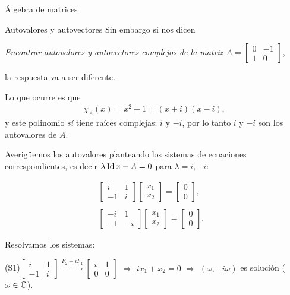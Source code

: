 \begin{chapter}{\'Algebra de matrices}
\begin{section}{Autovalores y autovectores}
        Sin embargo si nos dicen 
        \begin{center}
            \textit{Encontrar autovalores y autovectores complejos de la matriz  $A= \begin{bmatrix}0&-1\\1&0\end{bmatrix}$}, 
        \end{center}
        la respuesta va a ser diferente. 

        Lo  que ocurre es que 
        \begin{align*}
        \chi_A(x)=x^2+1=(x+i)(x-i),
        \end{align*}
        y este polinomio \textit{sí} tiene raíces complejas: $i$ y $-i$, por lo tanto  $i$ y $-i$ son los autovalores de $A$.

        Averigüemos los autovalores planteando los sistemas de ecuaciones correspondientes,  es decir $\lambda \operatorname{Id} x-A =0$ para $\lambda=i, -i$:

        \begin{align*}
            \begin{bmatrix}   i& 1\\ -1&i\end{bmatrix}
            \begin{bmatrix}    x_1\\x_2\end{bmatrix}
            =
            \begin{bmatrix}    0\\0\end{bmatrix},
            \tag{S1}
            \\
            &
            \\
            \begin{bmatrix}    -i&1 \\ -1&-i\end{bmatrix}
            \begin{bmatrix}    x_1\\x_2\end{bmatrix}
            =
            \begin{bmatrix}    0\\0\end{bmatrix}.
            \tag{S2}
        \end{align*}
        
        Resolvamos los sistemas:

        (S1)\quad $\begin{bmatrix} i& 1\\ -1&i\end{bmatrix} \stackrel{F_2 -i F_1}{\longrightarrow} \begin{bmatrix} i& 1\\ 0&0\end{bmatrix} $  $\Rightarrow$ $ix_1 +  x_2=0$ $\Rightarrow$ $(\omega ,-i\omega)$ es solución ($\omega \in \mathbb C$).


\end{section}
\end{chapter}
